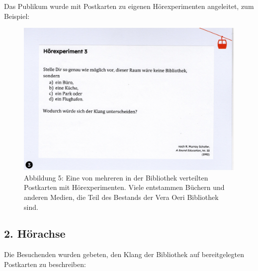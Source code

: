 \documentclass[a4paper,
fontsize=11pt,
oneside,
numbers=noperiodatend,
parskip=half-,
bibliography=totoc,
final
]{scrartcl}
\begin{document}
Das Publikum wurde mit Postkarten zu eigenen Hörexperimenten angeleitet,
zum Beispiel:

\begin{figure}[h]
\centering
\includegraphics{img/Abb5.jpg}
\caption{Abbildung 5: Eine von mehreren in der Bibliothek verteilten
Postkarten mit Hörexperimenten. Viele entstammen Büchern und anderen
Medien, die Teil des Bestands der Vera Oeri Bibliothek sind.}
\end{figure}

\hypertarget{huxf6rachse-1}{%
\subsection{2. Hörachse}\label{huxf6rachse-1}}

Die Besuchenden wurden gebeten, den Klang der Bibliothek auf
bereitgelegten Postkarten zu beschreiben:
\end{document}
